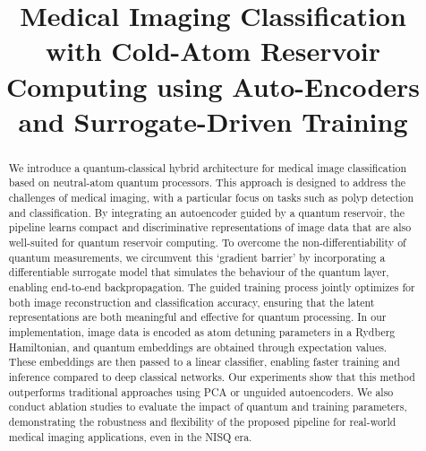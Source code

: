 \documentclass[conference]{IEEEtran}
\begin{document}
\title{Medical Imaging Classification with Cold-Atom Reservoir Computing using Auto-Encoders and Surrogate-Driven Training\\
}

\author{}


\maketitle


\begin{abstract}
We introduce a quantum-classical hybrid
architecture for medical image classification based on neutral-atom quantum processors. This approach is designed to address the challenges of medical imaging, with a particular focus on tasks such as polyp detection and classification. By integrating an autoencoder guided by a quantum reservoir, the pipeline learns compact and discriminative representations of image data that are also well-suited for quantum reservoir computing. To overcome the non-differentiability of quantum measurements, we circumvent this `gradient barrier' by incorporating a differentiable surrogate model that simulates the behaviour of the quantum layer, enabling end-to-end backpropagation. The guided training process jointly optimizes for both image reconstruction and classification accuracy, ensuring that the latent representations are both meaningful and effective for quantum processing. In our implementation, image data is encoded as atom detuning parameters in a Rydberg Hamiltonian, and quantum embeddings are obtained through expectation values. These embeddings are then passed to a linear classifier, enabling faster training and inference compared to deep classical networks. Our experiments show that this method outperforms traditional approaches using PCA or unguided autoencoders. We also conduct ablation studies to evaluate the impact of quantum and training parameters, demonstrating the robustness and flexibility of the proposed pipeline for real-world medical imaging applications, even in the NISQ era.

\end{abstract}
\end{document}
